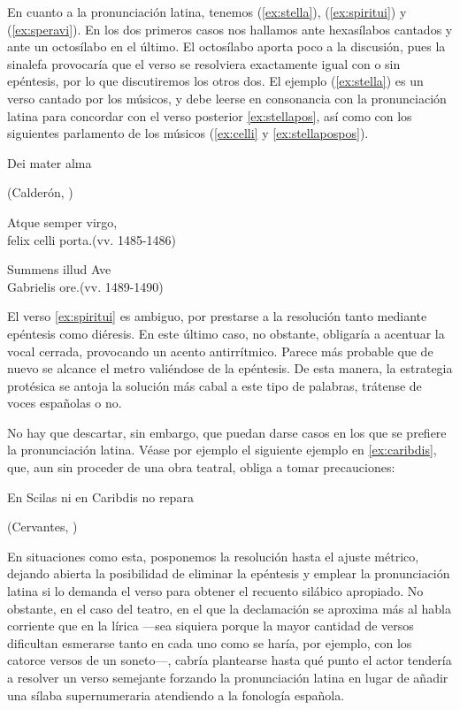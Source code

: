 En cuanto a la pronunciación latina, tenemos (\ref{ex:stella}), (\ref{ex:spiritui}) y (\ref{ex:speravi}). En los dos primeros casos nos hallamos ante hexasílabos cantados y ante un octosílabo en el último. El octosílabo aporta poco a la discusión, pues la sinalefa provocaría que el verso se resolviera exactamente igual con o sin epéntesis, por lo que discutiremos los otros dos. El ejemplo (\ref{ex:stella}) es un verso cantado por los músicos, y debe leerse en consonancia con la pronunciación latina para concordar con el verso posterior \ref{ex:stellapos}, así como con los siguientes parlamento de los músicos (\ref{ex:celli} y \ref{ex:stellapospos}).

\begin{exe}\ex\begin{xlist}
		\ex Dei mater alma\strut\hfill(Calderón, )\label{ex:stellapos}
		
		\ex\label{ex:celli}Atque semper virgo,\\felix celli porta.\hfill(vv. 1485-1486)
		
		\ex Summens illud Ave\\Gabrielis ore.\hfill(vv. 1489-1490)\label{ex:stellapospos}
	\end{xlist}
\end{exe}
El verso \ref{ex:spiritui} es ambiguo, por prestarse a la resolución tanto mediante epéntesis como diéresis. En este último caso, no obstante, obligaría a acentuar la vocal cerrada, provocando un acento antirrítmico. Parece más probable que de nuevo se alcance el metro valiéndose de la epéntesis. De esta manera, la estrategia protésica se antoja la solución más cabal a este tipo de palabras, trátense de voces españolas o no.

No hay que descartar, sin embargo, que puedan darse casos en los que se prefiere la pronunciación latina. Véase por ejemplo el siguiente ejemplo en \ref{ex:caribdis}, que, aun sin proceder de una obra teatral, obliga a tomar precauciones:

\begin{exe}\ex\label{ex:caribdis}En Scilas ni en Caribdis no repara\\\strut\hfill(Cervantes, )
\end{exe}

En situaciones como esta, posponemos la resolución hasta el ajuste métrico, dejando abierta la posibilidad de eliminar la epéntesis y emplear la pronunciación latina si lo demanda el verso para obtener el recuento silábico apropiado. No obstante, en el caso del teatro, en el que la declamación se aproxima más al habla corriente que en la lírica —sea siquiera porque  la mayor cantidad de versos dificultan esmerarse tanto en cada uno como se haría, por ejemplo, con los catorce versos de un soneto—, cabría plantearse hasta qué punto el actor tendería a resolver un verso semejante forzando la pronunciación latina en lugar de añadir una sílaba supernumeraria atendiendo a la fonología española.

